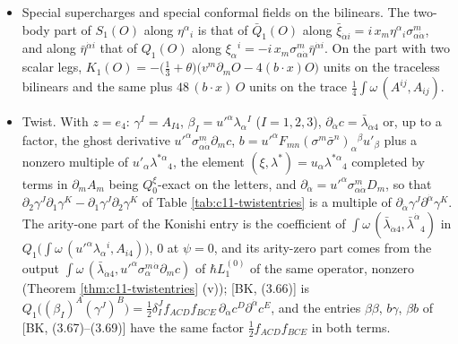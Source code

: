 \begin{remark}
\begin{itemize}
\item Special supercharges and special conformal fields on the bilinears. The two-body part of $S_1(O)$ along $\eta^\alpha{}_i$ is that of $\bar Q_1(O)$ along $\bar\xi_{\dot\alpha i}=i\,x_m\eta^\alpha{}_i\sigma^m_{\alpha\dot\alpha}$, and along $\bar\eta^{\dot\alpha i}$ that of $Q_1(O)$ along $\xi_\alpha{}^i=-i\,x_m\sigma^m_{\alpha\dot\alpha}\bar\eta^{\dot\alpha i}$. On the part with two scalar legs, $K_1(O)=-\big(\tfrac13+\theta\big)\big(v^m\partial_mO-4(b\cdot x)O\big)$ units on the traceless bilinears and the same plus $48\,(b\cdot x)\,O$ units on the trace $\tfrac14\int\omega\,(A^{ij},A_{ij})$.
\item Twist. With $z=e_4$: $\gamma^I=A_{I4}$, $\beta_I=u'^\alpha\lambda_\alpha{}^I$ ($I=1,2,3$), $\partial_{\dot\alpha}c=\bar\lambda_{\dot\alpha4}$ or, up to a factor, the ghost derivative $u'^\alpha\sigma^m_{\alpha\dot\alpha}\partial_mc$, $b=u'^\alpha F_{mn}(\sigma^m\bar\sigma^n)_\alpha{}^\beta u'_\beta$ plus a nonzero multiple of $u'_\alpha\lambda^{*\alpha}{}_4$, the element $(\xi,\lambda^*)=u_\alpha\lambda^{*\alpha}{}_4$ completed by terms in $\partial_mA_m$ being $Q^\xi_0$-exact on the letters, and $\partial_{\dot\alpha}=u'^\alpha\sigma^m_{\alpha\dot\alpha}D_m$, so that $\partial_2\gamma^J\partial_1\gamma^K-\partial_1\gamma^J\partial_2\gamma^K$ of Table \ref{tab:c11-twistentries} is a multiple of $\partial_{\dot\alpha}\gamma^J\partial^{\dot\alpha}\gamma^K$. The arity-one part of the Konishi entry is the coefficient of $\int\omega\,(\bar\lambda_{\dot\alpha4},\bar\lambda^{\dot\alpha}{}_4)$ in $Q_1\big(\int\omega\,(u'^\alpha\lambda_\alpha{}^i,A_{i4})\big)$, $0$ at $\psi=0$, and its arity-zero part comes from the output $\int\omega\,(\bar\lambda_{\dot\alpha4},u'^\alpha\sigma^m_\alpha{}^{\dot\alpha}\partial_mc)$ of $\hbar L_1^{(0)}$ of the same operator, nonzero (Theorem \ref{thm:c11-twistentries} (v)); [BK, (3.66)] is $Q_1\big((\beta_I)^A(\gamma^J)^B\big)=\tfrac12\delta^J_If_{ACD}f_{BCE}\,\partial_{\dot\alpha}c^D\partial^{\dot\alpha}c^E$, and the entries $\beta\beta$, $b\gamma$, $\beta b$ of [BK, (3.67)--(3.69)] have the same factor $\tfrac12f_{ACD}f_{BCE}$ in both terms.

\end{itemize}
\end{remark}
